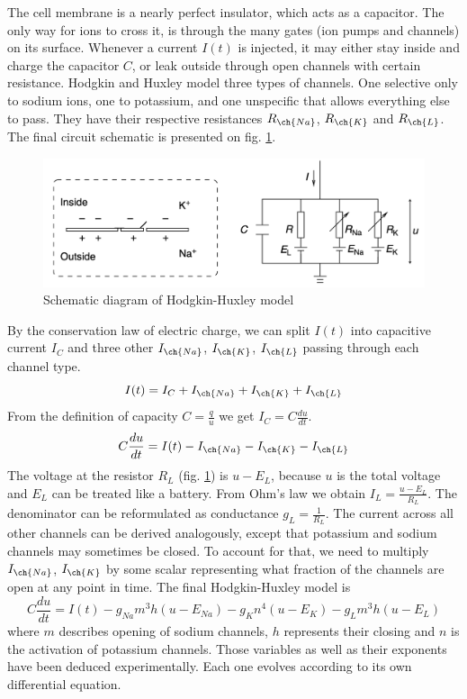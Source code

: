 \documentclass[12pt]{article}
\begin{document}
The cell membrane is a nearly perfect insulator, which acts as a capacitor. The only way for ions to cross it, is through the many gates (ion pumps and channels) on its surface.  Whenever a current $I(t)$ is  injected, it may either stay inside and charge the capacitor $C$, or leak outside through open channels with certain resistance. Hodgkin and Huxley model three types of channels. One selective only to sodium ions, one to potassium, and one unspecific that allows everything else to pass. They have their respective resistances $R_{\ch{Na}}$, $R_{\ch{K}}$ and $R_{\ch{L}}$. The final circuit schematic is presented on fig. \ref{fig:hodgkin_huxley_model}.
\begin{figure}[!htbp]
	\centering
	\includegraphics[width=13cm]{hodgkin_huxley_model}
	\caption{Schematic diagram of  Hodgkin-Huxley model}
	\label{fig:hodgkin_huxley_model}
\end{figure} 
By the conservation law of electric charge, we can split $I(t)$ into capacitive current $I_C$ and three other $I_{\ch{Na}}$, $I_{\ch{K}}$, $I_{\ch{L}}$ passing through each channel type.
\[
I(t) = I_C + I_{\ch{Na}} + I_{\ch{K}} + I_{\ch{L}}
\]
From the definition of capacity $C=\frac{q}{u}$ we get $I_C=C\frac{du}{dt}$.
\[
C \frac{du}{dt} = I(t) - I_{\ch{Na}} - I_{\ch{K}} - I_{\ch{L}}
\]
The voltage at the resistor $R_L$ (fig. \ref{fig:hodgkin_huxley_model}) is $u-E_L$, because $u$ is the total voltage and $E_L$ can be treated like a battery. From Ohm's law we obtain $I_L = \frac{u-E_L}{R_L}$. The denominator can be reformulated as conductance $g_L = \frac{1}{R_L}$. The current across all other channels can be derived analogously, except that potassium and sodium channels may sometimes be closed. To account for that, we need to multiply $ I_{\ch{Na}}$, $I_{\ch{K}} $ by some scalar representing what fraction of the channels are open at any point in time. The final Hodgkin-Huxley model is 
\[
C \frac{du}{dt}  = I(t) - g_{Na}m^3h(u-E_{Na}) - g_{K}n^4(u-E_{K}) - g_{L}m^3h(u-E_{L})
\]
where $m$ describes opening of sodium channels, $h$ represents their closing and $n$ is the activation of potassium channels. Those variables as well as their exponents have been deduced experimentally. Each one evolves according to its own differential equation. 
\end{document}
